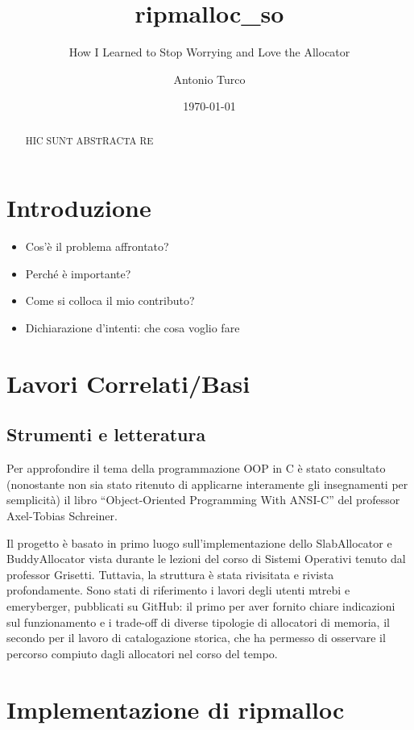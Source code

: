 \documentclass[noexaminfo]{sapthesis}  %
\title{ripmalloc\_so}
\subtitle{How I Learned to Stop Worrying and Love the Allocator}
\author{Antonio Turco}
\date{\today}
\begin{document}
\frontmatter  
\maketitle
\dedication{Dedicato a...}

\begin{abstract}
HIC SUNT ABSTRACTA RE
\end{abstract}

\tableofcontents

\mainmatter 
\chapter{Introduzione}

\begin{itemize}
  \item Cos’è il problema affrontato?
  \item Perché è importante?
  \item Come si colloca il mio contributo?
  \item Dichiarazione d’intenti: che cosa voglio fare
\end{itemize}

\chapter{Lavori Correlati/Basi}
\section{Strumenti e letteratura}

Per approfondire il tema della programmazione OOP in C è stato consultato (nonostante non sia stato ritenuto di applicarne interamente gli insegnamenti per semplicità) il libro “Object-Oriented Programming With ANSI-C” del professor Axel-Tobias Schreiner.

Il progetto è basato in primo luogo sull’implementazione dello SlabAllocator e BuddyAllocator vista durante le lezioni del corso di Sistemi Operativi tenuto dal professor Grisetti. Tuttavia, la struttura è stata rivisitata e rivista profondamente. Sono stati di riferimento i lavori degli utenti mtrebi e emeryberger, pubblicati su GitHub: il primo per aver fornito chiare indicazioni sul funzionamento e i trade-off di diverse tipologie di allocatori di memoria, il secondo per il lavoro di catalogazione storica, che ha permesso di osservare il percorso compiuto dagli allocatori nel corso del tempo.

\chapter{Implementazione di ripmalloc}
\end{document}
